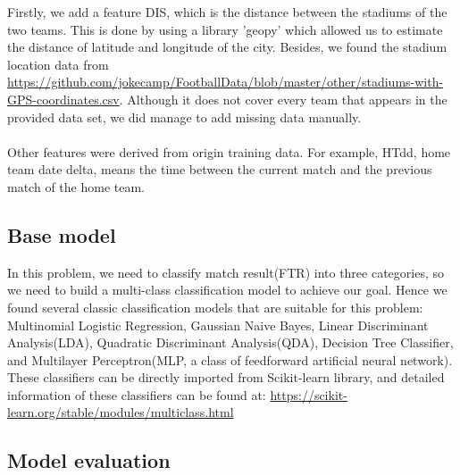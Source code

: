 \documentclass{article}
\begin{document}
Firstly, we add a feature DIS, which is the distance between the stadiums of the two teams. This is done by using a library 'geopy' which allowed us to estimate the distance of latitude and longitude of the city. Besides, we found the stadium location data from \url{https://github.com/jokecamp/FootballData/blob/master/other/stadiums-with-GPS-coordinates.csv}. Although it does not cover every team that appears in the provided data set, we did manage to add missing data manually.\\\\
Other features were derived from origin training data. For example, HTdd, home team date delta, means the time between the current match and the previous match of the home team. \\


\subsection{Base model}
In this problem, we need to classify match result(FTR) into three categories, so we need to build a multi-class classification model to achieve our goal. Hence we found several classic classification models that are suitable for this problem: Multinomial Logistic Regression, Gaussian Naive Bayes, Linear Discriminant Analysis(LDA), Quadratic Discriminant Analysis(QDA), Decision Tree Classifier, and Multilayer Perceptron(MLP, a class of feedforward artificial neural network). These classifiers can be directly imported from Scikit-learn library, and detailed information of these classifiers can be found at:  \url{https://scikit-learn.org/stable/modules/multiclass.html}\\

\subsection{Model evaluation}
\end{document}
